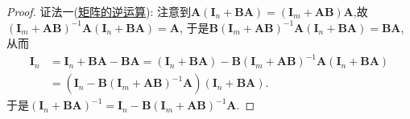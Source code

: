 \documentclass[../../main.tex]{subfiles}%
\begin{document}
\begin{proof}
{\color{blue}证法一(\hyperref[proposition:矩阵的逆运算]{矩阵的逆运算}):}
注意到\(\boldsymbol{A}(\boldsymbol{I}_{n}+\boldsymbol{BA})=(\boldsymbol{I}_{m}+\boldsymbol{AB})\boldsymbol{A}\),故\((\boldsymbol{I}_{m}+\boldsymbol{AB})^{-1}\boldsymbol{A}(\boldsymbol{I}_{n}+\boldsymbol{BA})=\boldsymbol{A}\),
于是\(\boldsymbol{B}(\boldsymbol{I}_{m}+\boldsymbol{AB})^{-1}\boldsymbol{A}(\boldsymbol{I}_{n}+\boldsymbol{BA})=\boldsymbol{BA}\),从而
\begin{align*}
\boldsymbol{I}_{n}&=\boldsymbol{I}_{n}+\boldsymbol{BA}-\boldsymbol{BA}=(\boldsymbol{I}_{n}+\boldsymbol{BA})-\boldsymbol{B}(\boldsymbol{I}_{m}+\boldsymbol{AB})^{-1}\boldsymbol{A}(\boldsymbol{I}_{n}+\boldsymbol{BA})\\
&=(\boldsymbol{I}_{n}-\boldsymbol{B}(\boldsymbol{I}_{m}+\boldsymbol{AB})^{-1}\boldsymbol{A})(\boldsymbol{I}_{n}+\boldsymbol{BA}).
\end{align*}
于是\((\boldsymbol{I}_{n}+\boldsymbol{BA})^{-1}=\boldsymbol{I}_{n}-\boldsymbol{B}(\boldsymbol{I}_{m}+\boldsymbol{AB})^{-1}\boldsymbol{A}\).


\end{proof}
\end{document}
